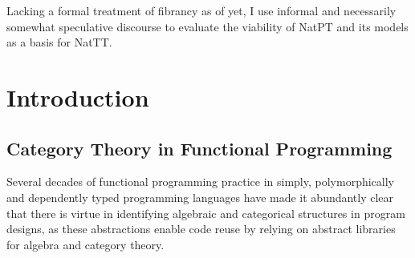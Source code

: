 \documentclass[twoLevelNum]{higherStructures} %
\begin{document}
Lacking a formal treatment of fibrancy as of yet, I use informal and necessarily somewhat speculative discourse to evaluate the viability of NatPT and its models as a basis for NatTT.

\section{Introduction}

\subsection{Category Theory in Functional Programming}
Several decades of functional programming practice in simply, polymorphically and dependently typed programming languages have made it abundantly clear that there is virtue in identifying algebraic and categorical structures in program designs, as these abstractions enable code reuse by relying on abstract libraries for algebra and category theory.
\end{document}
